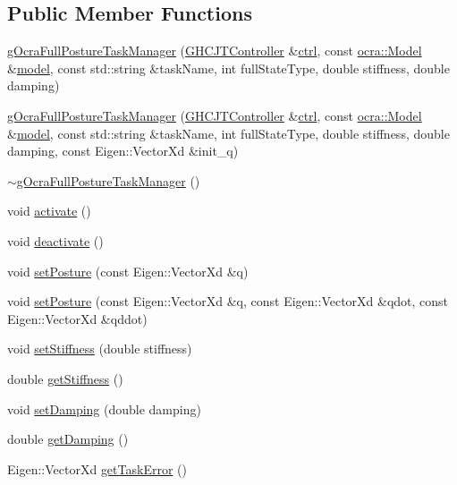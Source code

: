 \subsection*{Public Member Functions}
\begin{DoxyCompactItemize}
\item 
\hyperlink{classgocra_1_1gOcraFullPostureTaskManager_a71c039da046e968235f40e53838018c0}{g\+Ocra\+Full\+Posture\+Task\+Manager} (\hyperlink{classgocra_1_1GHCJTController}{G\+H\+C\+J\+T\+Controller} \&\hyperlink{classgocra_1_1gOcraTaskManagerBase_a52d76d9b54d92f3d31faeaafda99e4c7}{ctrl}, const \hyperlink{classocra_1_1Model}{ocra\+::\+Model} \&\hyperlink{classgocra_1_1gOcraTaskManagerBase_adc439e7170f7120611fc6d009d06404e}{model}, const std\+::string \&task\+Name, int full\+State\+Type, double stiffness, double damping)
\item 
\hyperlink{classgocra_1_1gOcraFullPostureTaskManager_a29b20652dfa8665e85cf88a75b1e681f}{g\+Ocra\+Full\+Posture\+Task\+Manager} (\hyperlink{classgocra_1_1GHCJTController}{G\+H\+C\+J\+T\+Controller} \&\hyperlink{classgocra_1_1gOcraTaskManagerBase_a52d76d9b54d92f3d31faeaafda99e4c7}{ctrl}, const \hyperlink{classocra_1_1Model}{ocra\+::\+Model} \&\hyperlink{classgocra_1_1gOcraTaskManagerBase_adc439e7170f7120611fc6d009d06404e}{model}, const std\+::string \&task\+Name, int full\+State\+Type, double stiffness, double damping, const Eigen\+::\+Vector\+Xd \&init\+\_\+q)
\item 
\hyperlink{classgocra_1_1gOcraFullPostureTaskManager_a20b181dde0293c33ed654036e9dcdbc0}{$\sim$g\+Ocra\+Full\+Posture\+Task\+Manager} ()
\item 
void \hyperlink{classgocra_1_1gOcraFullPostureTaskManager_a24c2b63ff065c8d7b056ccadddf55b59}{activate} ()
\item 
void \hyperlink{classgocra_1_1gOcraFullPostureTaskManager_aa53994ddf44ba5d9768ea3d3e5ba9931}{deactivate} ()
\item 
void \hyperlink{classgocra_1_1gOcraFullPostureTaskManager_a80bcb1334e7a9bb8604c8b091e32933d}{set\+Posture} (const Eigen\+::\+Vector\+Xd \&q)
\item 
void \hyperlink{classgocra_1_1gOcraFullPostureTaskManager_a86952f16b120b50f85fa75ce3ccd4ad0}{set\+Posture} (const Eigen\+::\+Vector\+Xd \&q, const Eigen\+::\+Vector\+Xd \&qdot, const Eigen\+::\+Vector\+Xd \&qddot)
\item 
void \hyperlink{classgocra_1_1gOcraFullPostureTaskManager_a30df8f38f4084c0404337f168ad741dc}{set\+Stiffness} (double stiffness)
\item 
double \hyperlink{classgocra_1_1gOcraFullPostureTaskManager_a34270c93e3c25b35c54e618d5af964d0}{get\+Stiffness} ()
\item 
void \hyperlink{classgocra_1_1gOcraFullPostureTaskManager_a0080d88c68d85320d0f0f68baf0260ad}{set\+Damping} (double damping)
\item 
double \hyperlink{classgocra_1_1gOcraFullPostureTaskManager_a946558f7ec0b0c58cbb3b83d19c4aad1}{get\+Damping} ()
\item 
Eigen\+::\+Vector\+Xd \hyperlink{classgocra_1_1gOcraFullPostureTaskManager_a8be4aac1fe7ec4f68e31f72a8aab6af8}{get\+Task\+Error} ()
\end{DoxyCompactItemize}

